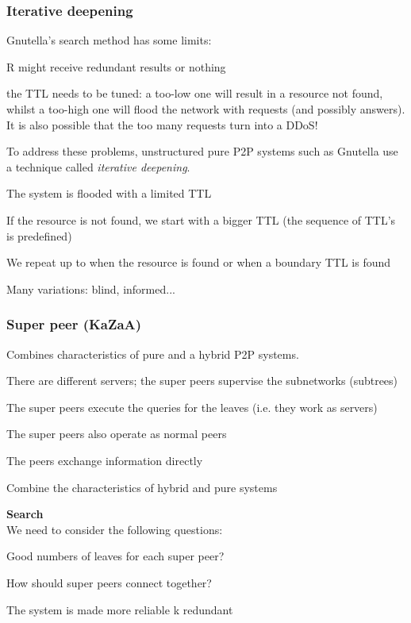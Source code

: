 \documentclass[paper=a4, fontsize=11pt]{scrartcl} %
\numberwithin{equation}{section} %
\numberwithin{figure}{section} %
\numberwithin{table}{section} %
\begin{document}
\subsubsection*{Iterative deepening}
Gnutella's search method has some limits:
\begin{compactenum}
	\item R might receive redundant results or nothing
	\item the TTL needs to be tuned: a too-low one will result in a resource not found, whilst a too-high one will flood the network with requests (and possibly answers). It is also possible that the too many requests turn into a DDoS!
\end{compactenum}
To address these problems, unstructured pure P2P systems such as Gnutella use a technique called \textit{iterative deepening}.
\begin{compactenum}
\item The system is flooded with a limited TTL
\item If the resource is not found, we start with a bigger TTL (the sequence of TTL's is predefined)
\item We repeat up to when the resource is found or when a boundary TTL is found

Many variations: blind, informed...
\end{compactenum}

\subsubsection*{Super peer (KaZaA)}
Combines characteristics of pure and a hybrid P2P systems.
\begin{compactitem}
\item There are different servers; the super peers supervise the subnetworks (subtrees)
\item The super peers execute the queries for the leaves (i.e. they work as servers)
\item The super peers also operate as normal peers
\item The peers exchange information directly
\item Combine the characteristics of hybrid and pure systems
\end{compactitem}
\textbf{Search} \\
We need to consider the following questions:
\begin{compactitem}
\item Good numbers  of leaves for each super peer?
\item How should super peers connect together?
\item The system is made more reliable k redundant
\end{compactitem}
\end{document}
